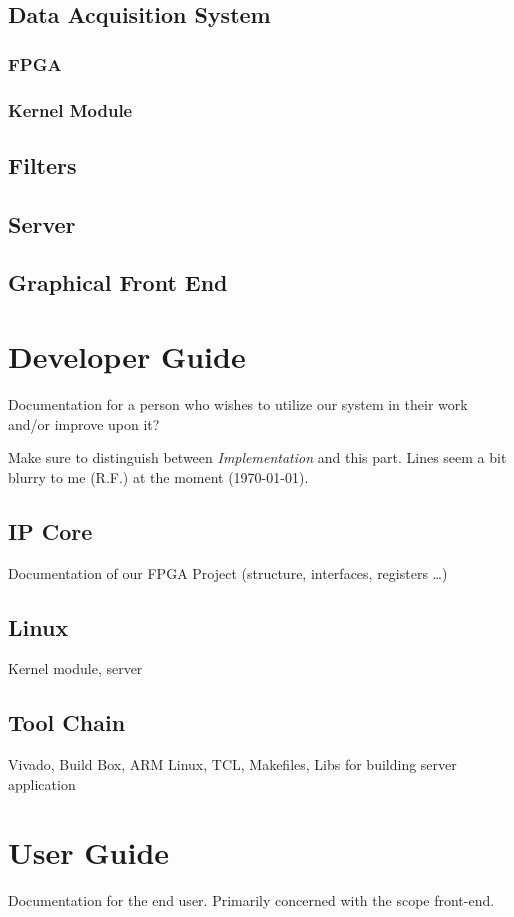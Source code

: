 \documentclass[a4paper,oneside]{alpenthesis/alpenthesis}
\begin{document}
\chapter{Data Acquisition System}
\section{FPGA}
\section{Kernel Module}

\chapter{Filters}
\chapter{Server}
\chapter{Graphical Front End}

\part{Developer Guide}
Documentation for a person who wishes to utilize our system in their work and/or
improve upon it?

Make sure  to distinguish  between \emph{Implementation} and  this part. Lines
seem a bit blurry to me (R.F.) at the moment (\today).

\chapter{IP Core}
Documentation of our FPGA Project (structure, interfaces, registers \ldots)
\chapter{Linux}
Kernel module, server

\chapter{Tool Chain}
Vivado, Build Box, ARM Linux, TCL, Makefiles, Libs for building server application

\part{User Guide}
Documentation for the end user. Primarily concerned with the scope front-end.
\end{document}
